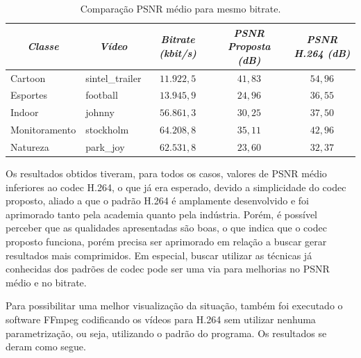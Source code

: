 \documentclass[cic,tc]{iiufrgs}
\begin{document}
\begin{table}[h]
    \caption{Comparação PSNR médio para mesmo bitrate.}
    \centering
        \begin{tabular}{|l|l|c|c|c|}
          \hline
          \multicolumn{1}{|c}{\textit{Classe}} & 
          \multicolumn{1}{|c}{\textit{Vídeo}} & 
          \multicolumn{1}{|c|}{\textit{Bitrate (kbit/s)}} &
          \multicolumn{1}{|c}{\textit{PSNR Proposta (dB)}} & 
          \multicolumn{1}{|c|}{\textit{PSNR H.264 (dB)}} \\
          \hline
          \hline
          Cartoon & sintel\_trailer & $11.922,5$ & $41,83$ & $54,96$ \\
          Esportes & football & $13.945,9$ & $24,96$ & $36,55$ \\
          Indoor & johnny & $56.861,3$ & $30,25$ & $37,50$ \\
          Monitoramento & stockholm & $64.208,8$ & $35,11$ & $42,96$ \\
          Natureza & park\_joy & $62.531,8$ & $23,60$ & $32,37$ \\
          \hline
        \end{tabular}
    \label{tbl:bitrateh264}
\end{table}

Os resultados obtidos tiveram, para todos os casos, valores de PSNR médio inferiores
ao codec H.264, o que já era esperado, devido a simplicidade do codec proposto, 
aliado a que o padrão H.264 é amplamente desenvolvido e foi aprimorado tanto pela 
academia quanto pela indústria.
Porém, é possível perceber que as qualidades apresentadas são boas, o que indica que 
o codec proposto funciona, porém precisa ser aprimorado em relação a buscar gerar 
resultados mais comprimidos.
Em especial, buscar utilizar as técnicas já conhecidas dos padrões de codec pode 
ser uma via para melhorias no PSNR médio e no bitrate.

Para possibilitar uma melhor visualização da situação, também foi executado o 
software FFmpeg codificando os vídeos para H.264 sem utilizar nenhuma parametrização, 
ou seja, utilizando o padrão do programa.
Os resultados se deram como segue.
\end{document}
